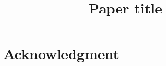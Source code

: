 \documentclass[conference]{IEEEtran}
\begin{document}
\title{Paper title
}


\author{

}

\newcommand{\bob}[1]{\textcolor{blue}{Ruichao:~#1}}
\newcommand{\todoBob}[1]{\textcolor{red}{ToDo Bob:~#1}}
\newcommand{\refig}[1]      {{Fig.~\ref{#1}}}
\newcommand{\refsec}[1]      {{Sec.~\ref{#1}}}

\newcommand{\etal}[1] {#1 \textit{et al.}}

\maketitle

\thispagestyle{empty}
\pagestyle{empty}


\begin{abstract}

\end{abstract}

\begin{IEEEkeywords}
\end{IEEEkeywords}










\section*{Acknowledgment}
\label{sec:acknowledgment}




%
%

\renewcommand*{\bibfont}{\footnotesize}
\printbibliography%
\end{document}
